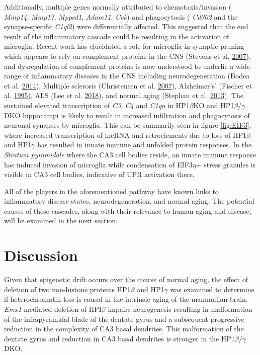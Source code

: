 \documentclass[onehalf,12pt]{beavtex}
\begin{document}
  Additionally, multiple genes normally attributed to chemotaxis/invasion
  ( \emph{Mmp14}, \emph{Mmp17}, \emph{Mpped1}, \emph{Adam11}, \emph{Cck})
  and phagocytosis ( \emph{Cd302} and the synapse-specific \emph{C1ql2})
  were differentially affected. This suggested that the end result of the
  inflammatory cascade could be resulting in the activation of microglia.
  Recent work has elucidated a role for microglia in synaptic pruning
  which appears to rely on complement proteins in the CNS (Stevens et al.
  \protect\hyperlink{ref-StevensClassicalComplementCascade2007}{2007}),
  and dysregulation of complement proteins is now understood to underlie a
  wide range of inflammatory diseases in the CNS including
  neurodegeneration (Bodea et al.
  \protect\hyperlink{ref-BodeaNeurodegenerationActivationMicroglial2014}{2014}),
  Multiple sclerosis (Christensen et al.
  \protect\hyperlink{ref-ChristensenGeneenvironmentinteractions2007a}{2007}),
  Alzheimer's' (Fischer et al.
  \protect\hyperlink{ref-FischerComplementC1qC31995}{1995}), ALS (Lee et
  al. \protect\hyperlink{ref-LeeComplementcomponentsare2018}{2018}), and
  normal aging (Stephan et al.
  \protect\hyperlink{ref-StephanDramaticIncreaseC1q2013}{2013}). The
  sustained elevated transcription of \emph{C3}, \emph{C4} and \emph{C1qa}
  in HP1\(\beta\)KO and HP1\(\beta\)/\(\gamma\) DKO hippocampi is likely
  to result in increased infiltration and phagocytosis of neuronal
  synapses by microglia. This can be summarily seen in figure
  \ref{fig:EIF3}, where increased transcription of lncRNA and
  retroelements due to loss of HP1\(\beta\) and HP1\(\gamma\) has resulted
  in innate immune and unfolded protein responses. In the \emph{Stratum
  pyramidale} where the CA3 cell bodies reside, an innate immune response
  has induced invasion of microglia while condensation of EIF3\(\eta\)+
  stress granules is visible in CA3 cell bodies, indicative of UPR
  activation there.
  
  All of the players in the aforementioned pathway have known links to
  inflammatory disease states, neurodegeneration, and normal aging. The
  potential causes of these cascades, along with their relevance to human
  aging and disease, will be examined in the next section.
  
  \chapter{Discussion}\label{discussion}
  
  Given that epigenetic drift occurs over the course of normal aging, the
  effect of deletion of two non-histone proteins HP1\(\beta\) and
  HP1\(\gamma\) was examined to determine if heterochromatin loss is
  causal in the intrinsic aging of the mammalian brain.
  \emph{Emx1}-mediated deletion of HPI\(\beta\) impairs neurogenesis
  resulting in malformation of the infrapyramidal blade of the dentate
  gyrus and a subsequent progressive reduction in the complexity of CA3
  basal dendrites. This malformation of the dentate gyrus and reduction in
  CA3 basal dendrites is stronger in the HP1\(\beta\)/\(\gamma\) DKO.
  
\end{document}
